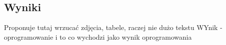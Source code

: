 \subsection{Wyniki}

Proponuje tutaj wrzucać zdjęcia, tabele, raczej nie dużo tekstu
WYnik - oprogramowanie i to co wychodzi jako wynik oprogramowania 